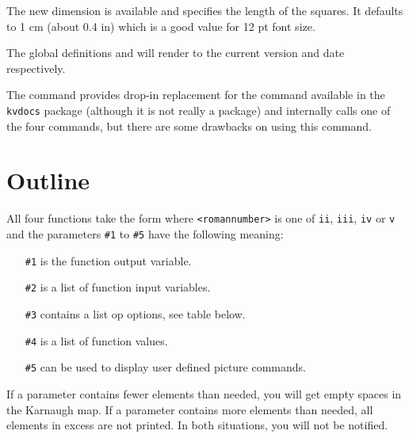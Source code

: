 \documentclass[a4paper,10pt]{ltxdoc}
\newcommand\Package[1]{\texttt{#1}}
\begin{document}
The new dimension  is available and specifies
the length of the squares. It defaults to 1 cm (about 0.4 in) which is a good
value for 12 pt font size.

The global definitions  and  will render
to the current version and date respectively.

The command  provides drop-in replacement for the 
command available in the \Package{kvdocs} package (although it is not really a
package) and internally calls one of the four
commands, but there are some drawbacks on using this command.

\newpage
\section{Outline}
\label{sec:outline}
All four functions take the form
where \texttt{<romannumber>} is one of \texttt{ii}, \texttt{iii}, \texttt{iv}
or \texttt{v} and the parameters \texttt{\#1} to \texttt{\#5} have the
following meaning:

\begin{itemize}
	\itemsep0pt
	\item[\texttt{\#1}] is the function output variable.
	\item[\texttt{\#2}] is a list of function input variables.
	\item[\texttt{\#3}] contains a list op options, see table below.
	\item[\texttt{\#4}] is a list of function values.
	\item[\texttt{\#5}] can be used to display user defined picture commands.
\end{itemize}

If a parameter contains fewer elements than needed, you will get empty spaces
in the Karnaugh map. If a parameter contains more elements than needed, all
elements in excess are not printed. In both situations, you will not be
notified.\newline
\end{document}
